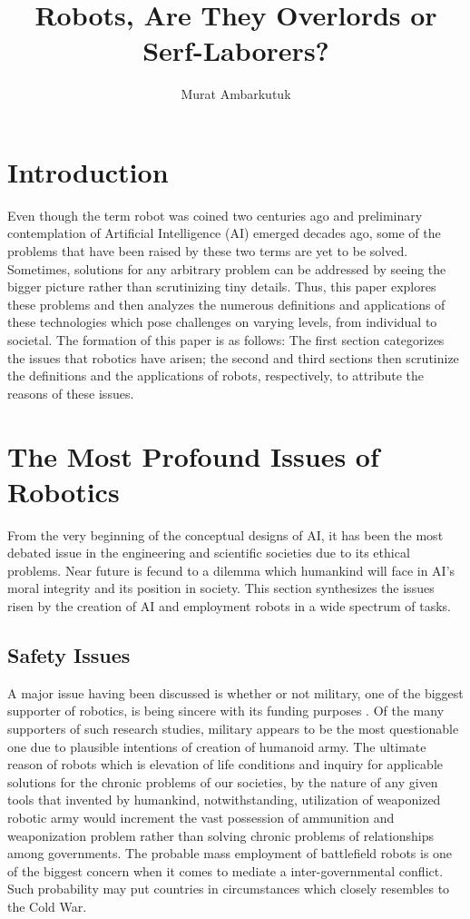 \documentclass[man]{apa6}
\title{Robots, Are They Overlords or Serf-Laborers?}
\author{Murat Ambarkutuk}
\affiliation{English Language Institute, University of Delaware \\ murata@udel.
edu}
\begin{document}
\maketitle

\section{Introduction}
Even though the term robot was coined two centuries ago and preliminary contemplation of Artificial Intelligence (AI) emerged decades ago, some of the problems that have been raised by these two terms are yet to be solved.
Sometimes, solutions for any arbitrary problem can be addressed by seeing the bigger picture rather than scrutinizing tiny details.
Thus, this paper explores these problems and then analyzes the numerous definitions and applications of these technologies which pose challenges on varying levels, from individual to societal.
The formation of this paper is as follows: The first section categorizes the issues that robotics have arisen; the second and third sections then scrutinize the definitions and the applications of robots, respectively, to attribute the reasons of these issues. 

\section{The Most Profound Issues of Robotics}
From the very beginning of the conceptual designs of AI, it has been the most debated issue in the engineering and scientific societies due to its ethical problems.
Near future is fecund to a dilemma which humankind will face in AI's moral integrity and its position in society.
This section synthesizes the issues risen by the creation of AI and employment robots in a wide spectrum of tasks.

\subsection{Safety Issues}
A major issue having been discussed is whether or not military, one of the biggest supporter of robotics, is being sincere with its funding purposes \cite{gre}.
Of the many supporters of such research studies, military appears to be the most questionable one due to plausible intentions of creation of humanoid army.
The ultimate reason of robots which is elevation of life conditions and inquiry for applicable solutions for the chronic problems of our societies, by the nature of any given tools that invented by humankind, notwithstanding, utilization of weaponized robotic army would increment the vast possession of ammunition and weaponization problem rather than solving chronic problems of relationships among governments.
The probable mass employment of battlefield robots is one of the biggest concern when it comes to mediate a inter-governmental conflict. Such probability may put countries in circumstances which closely resembles to the Cold War. \par
\end{document}

